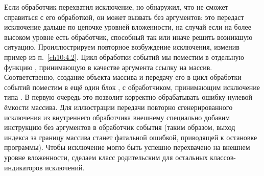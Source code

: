 Если обработчик перехватил исключение, но обнаружил, что не сможет справиться с его обработкой, он может вызвать
 без аргументов: это передаст исключение дальше по цепочке уровней вложенности, на случай
если на более высоком уровне есть обработчик, способный так или иначе решить возникшую ситуацию. Проиллюстрируем
повторное возбуждение исключения, изменив пример из п.~\ref{ch10:4.2}. Цикл обработки событий мы поместим в отдельную функцию
, принимающую в качестве аргумента ссылку на массив. Соответственно, создание объекта
массива и передачу его в цикл обработки событий поместим в ещё один блок , с обработчиком,
принимающим исключение типа .  В первую очередь это позволит корректно обрабатывать
ошибку нулевой ёмкости массива. Для иллюстрации передачи повторно сгенерированного исключения из внутреннего
обработчика внешнему специально добавим инструкцию  без аргументов в обработчик события 
 (таким образом, выход индекса за границу массива станет фатальной ошибкой,
приводящей к остановке программы). Чтобы исключение могло быть успешно перехвачено на внешнем уровне вложенности,
сделаем класс  родительским для остальных классов-индикаторов исключений.
